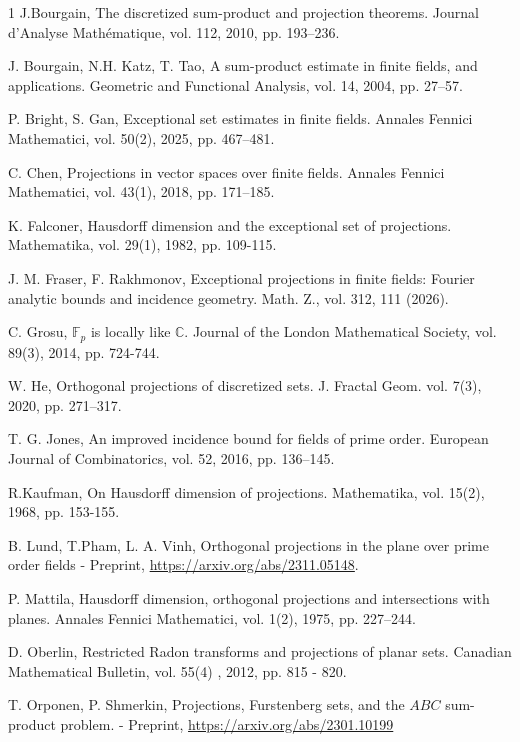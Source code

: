 \documentclass{amsart}
\newcommand{\F}{\mathbb F}
\begin{document}
\begin{thebibliography}{1}
J.Bourgain,
The discretized sum-product and projection theorems. Journal d'Analyse Mathématique, vol. 112, 2010, pp. 193–236.

J. Bourgain, N.H. Katz, T. Tao,
A sum-product estimate in finite fields, and applications. Geometric and Functional Analysis, vol. 14,  2004, pp. 27–57.

P. Bright, S. Gan,
Exceptional set estimates in finite fields. Annales Fennici Mathematici, vol. 50(2), 2025, pp. 467–481.

C. Chen,
Projections in vector spaces over finite fields. Annales Fennici Mathematici, vol. 43(1), 2018, pp. 171–185.

K. Falconer,
Hausdorff dimension and the exceptional set of projections. Mathematika, vol. 29(1), 1982, pp. 109-115.

J. M. Fraser, F. Rakhmonov,
Exceptional projections in finite fields: Fourier analytic bounds and incidence geometry. Math. Z., vol. 312, 111 (2026).

C. Grosu,
$\F_p$ is locally like $\mathbb{C}$.  Journal of the London Mathematical Society, vol. 89(3), 2014, pp. 724-744.

W. He, 
Orthogonal projections of discretized sets. J. Fractal Geom. vol. 7(3), 2020, pp. 271–317.

T. G. Jones,
An improved incidence bound for fields of prime order. European Journal of
Combinatorics,  vol. 52, 2016, pp. 136–145.

R.Kaufman,
On Hausdorff dimension of projections. Mathematika, vol. 15(2), 1968, pp. 153-155.

B. Lund, T.Pham, L. A. Vinh,
Orthogonal projections in the plane over prime order fields - Preprint, \url{https://arxiv.org/abs/2311.05148}.

P. Mattila,
Hausdorff dimension, orthogonal projections and intersections with planes. Annales Fennici Mathematici, vol. 1(2), 1975, pp. 227–244.

D. Oberlin,
Restricted Radon transforms and projections of planar sets. Canadian Mathematical Bulletin, vol. 55(4) , 2012, pp. 815 - 820.

T. Orponen, P. Shmerkin,
Projections, Furstenberg sets, and the $ABC$ sum-product problem. - Preprint, \url{https://arxiv.org/abs/2301.10199}


\end{thebibliography}
\end{document}
